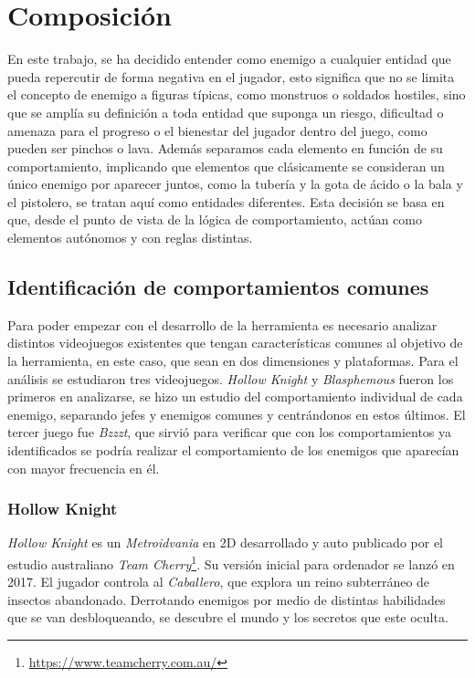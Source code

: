 \section{Composición}
En este trabajo, se ha decidido entender como enemigo a cualquier entidad que pueda repercutir de forma negativa en el jugador, esto significa que no se limita el concepto de enemigo a figuras típicas, como monstruos o soldados hostiles, sino que se amplía su definición a toda entidad que suponga un riesgo, dificultad o amenaza para el progreso o el bienestar del jugador dentro del juego, como pueden ser pinchos o lava.
Además separamos cada elemento en función de su comportamiento, implicando que elementos que clásicamente se consideran un único enemigo por aparecer juntos, como la tubería y la gota de ácido o la bala y el pistolero, se tratan aquí como entidades diferentes. Esta decisión se basa en que, desde el punto de vista de la lógica de comportamiento, actúan como elementos autónomos y con reglas distintas.\\

\subsection{Identificación de comportamientos comunes}
Para poder empezar con el desarrollo de la herramienta es necesario analizar distintos videojuegos existentes que tengan características comunes al objetivo de la herramienta, en este caso, que sean en dos dimensiones y plataformas.
Para el análisis se estudiaron tres videojuegos. \textit{Hollow Knight} y \textit{Blasphemous} fueron los primeros en analizarse, se hizo un estudio del comportamiento individual de cada enemigo, separando jefes y enemigos comunes y centrándonos en estos últimos. El tercer juego fue \textit{Bzzzt}, que sirvió para verificar que con los comportamientos ya identificados se podría realizar el comportamiento de los enemigos que aparecían con mayor frecuencia en él. 

\subsubsection{Hollow Knight}
\textit{Hollow Knight} es un \emph{Metroidvania} en 2D desarrollado y auto publicado por el estudio australiano \emph{Team Cherry}\footnote{\url{https://www.teamcherry.com.au/}}. Su versión inicial para ordenador se lanzó en 2017. El jugador controla al \textit{Caballero}, que explora un reino subterráneo de insectos abandonado. Derrotando enemigos por medio de distintas habilidades que se van desbloqueando, se descubre el mundo y los secretos que este oculta.


